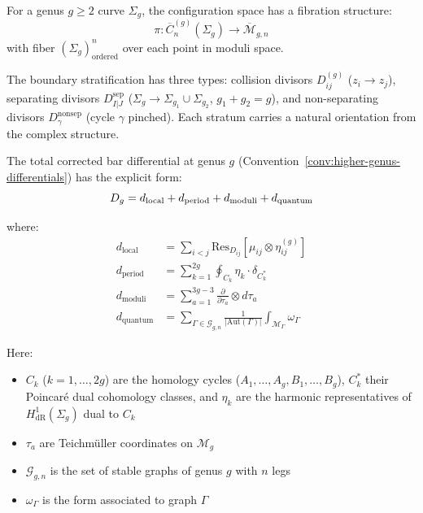 \begin{definition}\label{def:higher-genus-config}
For a genus $g \geq 2$ curve $\Sigma_g$, the configuration space has a fibration structure:
\[\pi: \overline{C}_n^{(g)}(\Sigma_g) \to \overline{\mathcal{M}}_{g,n}\]
with fiber $(\Sigma_g)^n_{\text{ordered}}$ over each point in moduli space.

The boundary stratification has three types: collision divisors $D_{ij}^{(g)}$ ($z_i \to z_j$), separating divisors $D_{I|J}^{\text{sep}}$ ($\Sigma_g \to \Sigma_{g_1} \cup \Sigma_{g_2}$, $g_1 + g_2 = g$), and non-separating divisors $D_\gamma^{\text{nonsep}}$ (cycle $\gamma$ pinched). Each stratum carries a natural orientation from the complex structure.
\end{definition}

\begin{theorem}\label{thm:higher-genus-diff}
The total corrected bar differential at genus $g$
\textup{(}Convention~\textup{\ref{conv:higher-genus-differentials})} has the explicit form:
\[D_{g} = d_{\text{local}} + d_{\text{period}} + d_{\text{moduli}} + d_{\text{quantum}}\]

where:
\begin{align}
d_{\text{local}} &= \sum_{i<j} \text{Res}_{D_{ij}} \left[\mu_{ij} \otimes \eta_{ij}^{(g)}\right] \\
d_{\text{period}} &= \sum_{k=1}^{2g} \oint_{C_k} \eta_k \cdot \delta_{C_k^*} \\
d_{\text{moduli}} &= \sum_{a=1}^{3g-3} \frac{\partial}{\partial \tau_a} \otimes d\tau_a \\
d_{\text{quantum}} &= \sum_{\Gamma \in \mathcal{G}_{g,n}} \frac{1}{|\text{Aut}(\Gamma)|} \int_{\mathcal{M}_\Gamma} \omega_\Gamma
\end{align}

Here:
\begin{itemize}
\item $C_k$ ($k = 1, \ldots, 2g$) are the homology cycles ($A_1,\ldots,A_g,B_1,\ldots,B_g$), $C_k^*$ their Poincar\'e dual cohomology classes, and $\eta_k$ are the harmonic representatives of $H^1_{\mathrm{dR}}(\Sigma_g)$ dual to $C_k$
\item $\tau_a$ are Teichmüller coordinates on $\mathcal{M}_g$
\item $\mathcal{G}_{g,n}$ is the set of stable graphs of genus $g$ with $n$ legs
\item $\omega_\Gamma$ is the form associated to graph $\Gamma$
\end{itemize}
\end{theorem}

